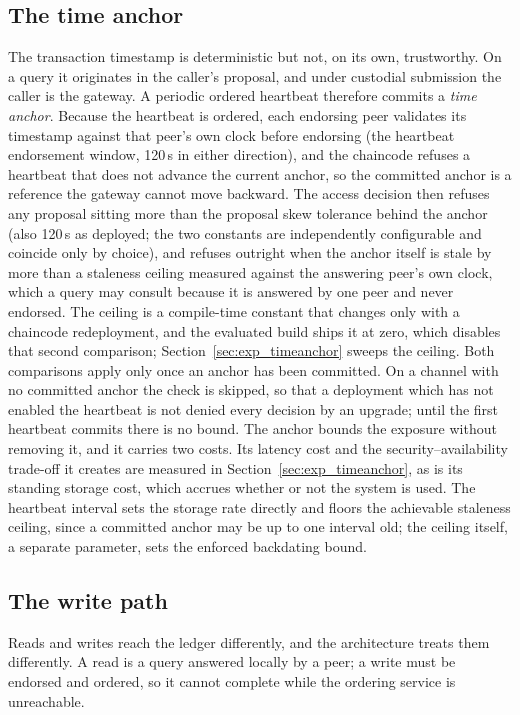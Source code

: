 \documentclass[preprint,12pt]{elsarticle}
\begin{document}
\subsection{The time anchor}
\label{sec:timeanchor_arch}

The transaction timestamp is deterministic but not, on its own, trustworthy.
On a query it originates in the caller's proposal, and under custodial
submission the caller is the gateway. A periodic ordered heartbeat
therefore commits a \emph{time anchor}. Because the heartbeat is ordered, each
endorsing peer validates its timestamp against that peer's own clock before
endorsing (the heartbeat endorsement window, 120\,s in either direction),
and the chaincode refuses a heartbeat that does not advance the
current anchor, so the committed anchor is a reference the gateway cannot move
backward. The access decision then refuses any proposal sitting more than the
proposal skew tolerance behind the anchor (also 120\,s as deployed; the two
constants are independently configurable and coincide only by choice), and refuses outright when the anchor
itself is stale by more than a staleness ceiling measured against the
answering peer's own clock, which a query may consult because it is answered
by one peer and never endorsed. The ceiling is a compile-time constant that
changes only with a chaincode redeployment, and the evaluated build ships it
at zero, which disables that second comparison;
Section~\ref{sec:exp_timeanchor} sweeps the ceiling. Both comparisons apply only once an anchor
has been committed. On a channel with no committed anchor the check is
skipped, so that a deployment which has not enabled the heartbeat is not
denied every decision by an upgrade; until the first heartbeat commits there
is no bound. The anchor bounds the exposure without
removing it, and it carries two costs. Its latency cost and the security--availability
trade-off it creates are measured in Section~\ref{sec:exp_timeanchor}, as is its
standing storage cost, which accrues whether or not the system is used. The heartbeat interval sets the storage rate directly and floors the
achievable staleness ceiling, since a committed anchor may be up to one
interval old; the ceiling itself, a separate parameter, sets the enforced
backdating bound.

\subsection{The write path}
\label{sec:writepath}

Reads and writes reach the ledger differently, and the architecture treats them
differently. A read is a query answered locally by a peer; a write must be
endorsed and ordered, so it cannot complete while the ordering service is
unreachable.
\end{document}
